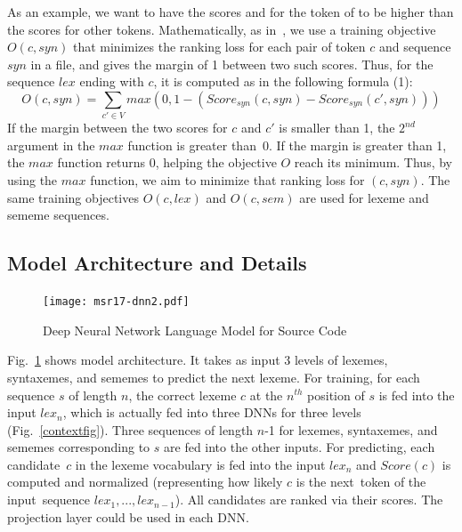 As an example, we want to have the scores  and
 for the token  of  to be
higher than the scores for other tokens. Mathematically, as 
in~\cite{huang12,collobert08}, we use a training objective
$O(c,syn)$ that minimizes the ranking loss for each pair of token $c$
and sequence $syn$ in a file, and gives the margin of 1 between two
such scores. Thus, for the sequence $lex$ ending with $c$, it is computed as in the following formula (1):
\[
O(c,syn) = \sum\limits_{c' \in V} max (0,1 - (Score_{syn}(c,syn) - Score_{syn}(c',syn)))
\]
If the margin between the two scores for $c$ and $c'$ is smaller than
1, the $2^{nd}$ argument in the $max$ function is greater than~0.  If
the margin is greater than 1, the $max$ function returns 0, helping
the objective $O$ reach its minimum.
%
Thus, by using the $max$ function, we aim to minimize that ranking
loss for $(c,syn)$.  The same training objectives $O(c,lex)$ and
$O(c,sem)$ are used for lexeme and sememe sequences.


\subsection{Model Architecture and Details}

\begin{figure}[t]
\centering
\texttt{[image: msr17-dnn2.pdf]} %
\vspace{-0.06in}
\caption{Deep Neural Network Language Model for Source Code}
\label{dnnfig}
\end{figure}

Fig.~{\ref{dnnfig}} shows model architecture. It takes as input
3 levels of lexemes, syntaxemes, and sememes to
predict the next lexeme.
%
For training, for each sequence $s$ of length $n$, the correct lexeme
$c$ at the $n^{th}$ position of $s$ is fed into the input $lex_n$,
which is actually fed into three DNNs for three levels
(Fig.~\ref{contextfig}).
%
Three sequences of length $n$-1 for lexemes, syntaxemes, and sememes
corresponding to $s$ are fed into the other inputs.
%
For predicting, each candidate~$c$ in the lexeme vocabulary is fed
into the input $lex_n$ and $Score(c)$ is computed and normalized
(representing how likely $c$ is the next~token of the input~sequ\-ence
$lex_1, ..., lex_{n-1}$). All candidates are ranked via
their scores. 
The projection layer could be used in each DNN.

